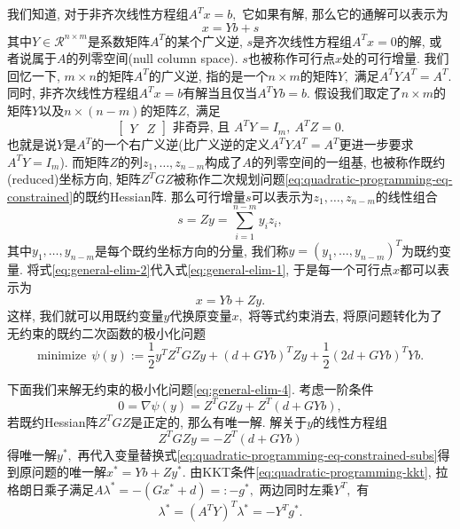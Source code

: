 \documentclass{SBCbookchapter}
\newcommand{\R}{\mathcal{R}}
\begin{document}
我们知道, 对于非齐次线性方程组$A^Tx = b,$ 它如果有解, 那么它的通解可以表示为
\begin{equation}
\label{eq:general-elim-1}
x = Y b + s
\end{equation}
其中$Y \in \R^{n\times m}$是系数矩阵$A^T$的某个广义逆, $s$是齐次线性方程组$A^T x = 0$的解, 或者说属于$A$的列零空间(null column space). $s$也被称作可行点$x$处的可行增量. 我们回忆一下, $m\times n$的矩阵$A^T$的广义逆, 指的是一个$n\times m$的矩阵$Y,$ 满足$A^T Y A^T = A^T.$ 同时, 非齐次线性方程组$A^Tx = b$有解当且仅当$A^T Y b = b.$ 假设我们取定了$n\times m$的矩阵$Y$以及$n \times (n-m)$的矩阵$Z,$ 满足
\begin{equation}
\label{eq:eq:general-elim-req}
\begin{bmatrix} Y & Z\end{bmatrix} \text{ 非奇异, 且~} A^T Y = I_m, ~ A^T Z = 0.
\end{equation}
也就是说$Y$是$A^T$的一个右广义逆(比广义逆的定义$A^T Y A^T = A^T$更进一步要求$A^T Y = I_m$). 而矩阵$Z$的列$z_1, \ldots, z_{n-m}$构成了$A$的列零空间的一组基, 也被称作既约(reduced)坐标方向, 矩阵$Z^T G Z$被称作二次规划问题\eqref{eq:quadratic-programming-eq-constrained}的既约Hessian阵. 那么可行增量$s$可以表示为$z_1, \ldots, z_{n-m}$的线性组合
\begin{equation}
\label{eq:general-elim-2}
s = Z y = \sum\limits_{i=1}^{n-m} y_i z_i,
\end{equation}
其中$y_1, \ldots, y_{n-m}$是每个既约坐标方向的分量, 我们称$y = (y_1, \ldots, y_{n-m})^T$为既约变量. 将式\eqref{eq:general-elim-2}代入式\eqref{eq:general-elim-1}, 于是每一个可行点$x$都可以表示为
\begin{equation}
\label{eq:general-elim-3}
x = Y b + Z y.
\end{equation}
这样, 我们就可以用既约变量$y$代换原变量$x,$ 将等式约束消去, 将原问题转化为了无约束的既约二次函数的极小化问题
\begin{equation}
\label{eq:general-elim-4}
\text{minimize} ~~ \psi(y) := \frac{1}{2} y^T Z^T G Z y + \left( d + G Y b \right)^T Z y + \frac{1}{2} \left( 2d + G Y b \right)^T Y b.
\end{equation}

下面我们来解无约束的极小化问题\eqref{eq:general-elim-4}. 考虑一阶条件
\begin{equation}
\label{eq:general-elim-5}
0 = \nabla \psi (y) = Z^T G Z y + Z^T \left( d + G Y b \right),
\end{equation}
若既约Hessian阵$Z^T G Z$是正定的, 那么有唯一解. 解关于$y$的线性方程组
\begin{equation}
\label{eq:general-elim-y}
Z^T G Z y = - Z^T \left( d + G Y b \right)
\end{equation}
得唯一解$y^*,$ 再代入变量替换式\eqref{eq:quadratic-programming-eq-constrained-subs}得到原问题的唯一解$x^* = Y b + Z y^*.$ 由KKT条件\eqref{eq:quadratic-programming-kkt}, 拉格朗日乘子满足$A\lambda^* = -\left( Gx^* + d \right) =: - g^*,$ 两边同时左乘$Y^T,$ 有
\begin{equation}
\label{eq:general-elim-lambda}
\lambda^* = \left( A^T Y \right)^T \lambda^* = -Y^T g^*.
\end{equation}
\end{document}
